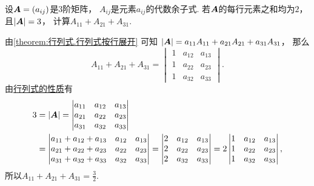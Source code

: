 \begin{example}
设\(\boldsymbol{A} = (a_{ij})\)是3阶矩阵，
\(A_{ij}\)是元素\(a_{ij}\)的代数余子式.
若\(\boldsymbol{A}\)的每行元素之和均为\(2\)，
且\(\abs{\boldsymbol{A}} = 3\)，
计算\(A_{11} + A_{21} + A_{31}\).
\begin{solution}
由\cref{theorem:行列式.行列式按行展开} 可知
\(\abs{\boldsymbol{A}} = a_{11} A_{11} + a_{21} A_{21} + a_{31} A_{31}\)，
那么\begin{equation*}
	A_{11} + A_{21} + A_{31}
	= \begin{vmatrix}
		1 & a_{12} & a_{13} \\
		1 & a_{22} & a_{23} \\
		1 & a_{32} & a_{33}
	\end{vmatrix}.
\end{equation*}
由\hyperref[theorem:行列式.性质6]{行列式的性质}有\begin{align*}
	3 &= \abs{\boldsymbol{A}} = \begin{vmatrix}
		a_{11} & a_{12} & a_{13} \\
		a_{21} & a_{22} & a_{23} \\
		a_{31} & a_{32} & a_{33}
	\end{vmatrix} \\
	&= \begin{vmatrix}
		a_{11} + a_{12} + a_{13} & a_{12} & a_{13} \\
		a_{21} + a_{22} + a_{23} & a_{22} & a_{23} \\
		a_{31} + a_{32} + a_{33} & a_{32} & a_{33}
	\end{vmatrix}
	= \begin{vmatrix}
		2 & a_{12} & a_{13} \\
		2 & a_{22} & a_{23} \\
		2 & a_{32} & a_{33}
	\end{vmatrix}
	= 2 \begin{vmatrix}
		1 & a_{12} & a_{13} \\
		1 & a_{22} & a_{23} \\
		1 & a_{32} & a_{33}
	\end{vmatrix},
\end{align*}
所以\(A_{11} + A_{21} + A_{31} = \frac32\).
\end{solution}
\end{example}

